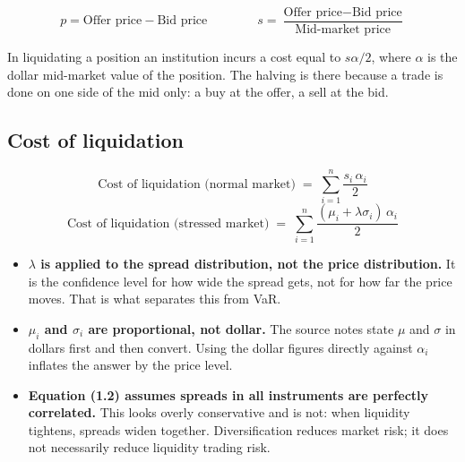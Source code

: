 \begin{lrfmlbox}
\[ p = \text{Offer price} - \text{Bid price} \qquad\qquad
   s = \frac{\text{Offer price} - \text{Bid price}}{\text{Mid-market price}} \]
\end{lrfmlbox}

In liquidating a position an institution incurs a cost equal to $s\alpha/2$, where $\alpha$ is the dollar mid-market value of the position. The halving is there because a trade is done on one side of the mid only: a buy at the offer, a sell at the bid.

\subsection{Cost of liquidation}

\begin{lrfmlbox}
\[ \text{Cost of liquidation (normal market)} \;=\; \sum_{i=1}^{n} \frac{s_i\,\alpha_i}{2} \]
\[ \text{Cost of liquidation (stressed market)} \;=\; \sum_{i=1}^{n} \frac{(\mu_i + \lambda\sigma_i)\,\alpha_i}{2} \]
\end{lrfmlbox}

\begin{lrtrapbox}
\begin{itemize}
\item \textbf{$\lambda$ is applied to the spread distribution, not the price distribution.} It is the confidence level for how wide the spread gets, not for how far the price moves. That is what separates this from VaR.
\item \textbf{$\mu_i$ and $\sigma_i$ are proportional, not dollar.} The source notes state $\mu$ and $\sigma$ in dollars first and then convert. Using the dollar figures directly against $\alpha_i$ inflates the answer by the price level.
\item \textbf{Equation (1.2) assumes spreads in all instruments are perfectly correlated.} This looks overly conservative and is not: when liquidity tightens, spreads widen together. Diversification reduces market risk; it does not necessarily reduce liquidity trading risk.
\end{itemize}
\end{lrtrapbox}

